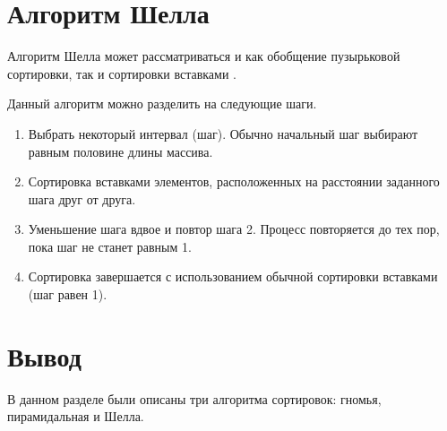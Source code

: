 \section{Алгоритм Шелла}


Алгоритм Шелла может рассматриваться и как обобщение пузырьковой сортировки, так и сортировки вставками \cite{shell}.

Данный алгоритм можно разделить на следующие шаги.

\begin{enumerate}
	\item Выбрать некоторый интервал (шаг). Обычно начальный шаг выбирают равным половине длины массива.
	\item Сортировка вставками элементов, расположенных на расстоянии заданного шага друг от друга.
	\item Уменьшение шага вдвое и повтор шага 2. Процесс повторяется до тех пор, пока шаг не станет равным 1.
	\item Сортировка завершается с использованием обычной сортировки вставками (шаг равен 1).
\end{enumerate}


\section*{Вывод}

В данном разделе были описаны три алгоритма сортировок: гномья, пирамидальная и Шелла.
